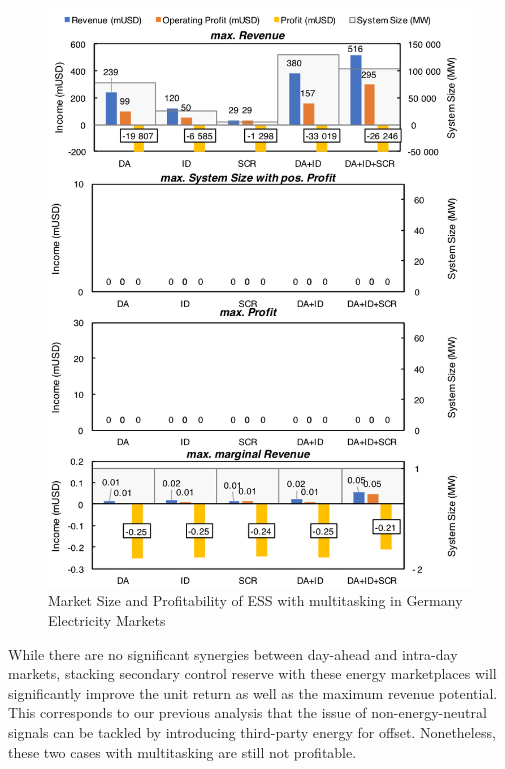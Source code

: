 \begin{figure}[h!]
	\centering
	\includegraphics[width=0.95\linewidth]{Figures/Germany_ESS_multitasking}
	\caption{Market Size and Profitability of ESS with multitasking in Germany Electricity Markets}
	\label{fig:germany-ess-multitasking}
\end{figure}

While there are no significant synergies between day-ahead and intra-day markets, stacking secondary control reserve with these energy marketplaces will significantly improve the unit return as well as the maximum revenue potential. This corresponds to our previous analysis that the issue of non-energy-neutral signals can be tackled by introducing third-party energy for offset. Nonetheless, these  two cases with multitasking are still not profitable. 

